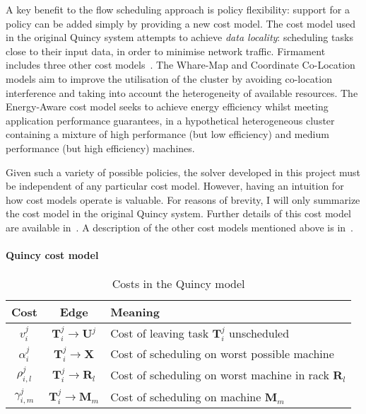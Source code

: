 A key benefit to the flow scheduling approach is policy flexibility: support for a policy can be added simply by providing a new cost model. The cost model used in the original Quincy system attempts to achieve \emph{data locality}: scheduling tasks close to their input data, in order to minimise network traffic. Firmament includes three other cost models~\cite[ch.~5]{Schwarzkopf:2015}. The Whare-Map and Coordinate Co-Location models aim to improve the utilisation of the cluster by avoiding co-location interference and taking into account the heterogeneity of available resources. The Energy-Aware cost model seeks to achieve energy efficiency whilst meeting application performance guarantees, in a hypothetical heterogeneous cluster containing a mixture of high performance (but low efficiency) and medium performance (but high efficiency) machines.

Given such a variety of possible policies, the solver developed in this project must be independent of any particular cost model. However, having an intuition for how cost models operate is valuable. For reasons of brevity, I will only summarize the cost model in the original Quincy system. Further details of this cost model are available in~\cite{Isard:2009}. A description of the other cost models mentioned above is in~\cite[ch.~5]{Schwarzkopf:2015}.

\paragraph{Quincy cost model}
\begin{table}
    \begin{tabular}{c|c|l}
        \hline 
        Cost & Edge & Meaning\tabularnewline
        \hline 
        \hline 
        $v_{i}^{j}$ & $\mathbf{T}_{i}^{j}\to\mathbf{U}^{j}$ & Cost of leaving task $\mathbf{T}_{i}^{j}$ unscheduled\tabularnewline
        \hline 
        $\alpha_{i}^{j}$ & $\mathbf{T}_{i}^{j}\to\mathbf{X}$ & Cost of scheduling on worst possible machine\tabularnewline
        \hline 
        $\rho_{i,l}^{j}$ & $\mathbf{T}_{i}^{j}\to\mathbf{R}_{l}$ & Cost of scheduling on worst machine in rack $\mathbf{R}_{l}$\tabularnewline
        \hline 
        $\gamma_{i,m}^{j}$ & $\mathbf{T}_{i}^{j}\to\mathbf{M}_{m}$ & Cost of scheduling on machine $\mathbf{M}_{m}$\tabularnewline
        \hline 
    \end{tabular}
    \caption{Costs in the Quincy model}
    \label{table:quincy-costs}
\end{table}

